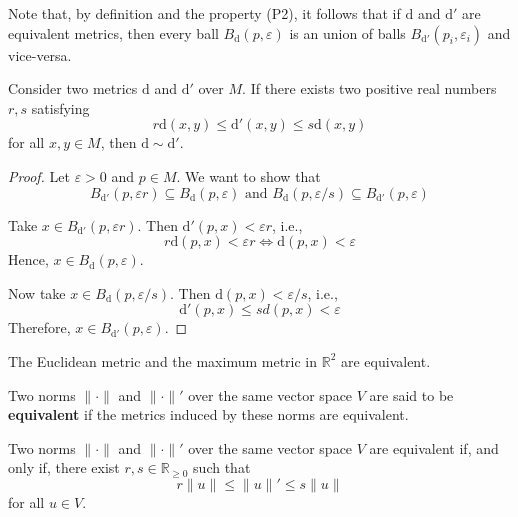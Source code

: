 Note that, by definition and the property (P2), it follows that if $\mathrm{d}$ and $\mathrm{d}'$ are equivalent metrics, then every ball $B_\mathrm{d}(p,\varepsilon)$ is an union of balls $B_{\mathrm{d}'}(p_i, \varepsilon_i)$ and vice-versa.

\begin{proposition}
	Consider two metrics $\mathrm{d}$ and $\mathrm{d}'$ over $M$. If there exists two positive real numbers $r, s$ satisfying
	\[
		r\mathrm{d}(x,y) \leq \mathrm{d}'(x,y) \leq s\mathrm{d}(x,y)
	\]
	for all $x,y \in M$, then $\mathrm{d} \sim \mathrm{d}'$.
\end{proposition}

\begin{proof}
	Let $\varepsilon > 0$ and $p \in M$. We want to show that 
	\[
		B_{\mathrm{d}'}(p, \varepsilon r) \subseteq B_\mathrm{d}(p, \varepsilon) \text{ and } B_\mathrm{d}(p, \varepsilon/s) \subseteq B_{\mathrm{d}'}(p,\varepsilon)
	\]

	Take $x \in B_{\mathrm{d}'}(p, \varepsilon r)$. Then $\mathrm{d}'(p, x) < \varepsilon r$, i.e.,
	\[
	    r\mathrm{d}(p,x) < \varepsilon r \iff \mathrm{d}(p,x) < \varepsilon
	\]
	Hence, $x \in B_\mathrm{d}(p, \varepsilon)$.

	Now take $x \in B_\mathrm{d}(p, \varepsilon / s)$. Then $\mathrm{d}(p,x) < \varepsilon/s$, i.e.,
	\[
		\mathrm{d}'(p,x) \leq sd(p,x) < \varepsilon
	\]
	Therefore, $x \in B_{\mathrm{d}'}(p, \varepsilon)$.
\end{proof}

\begin{example}
	The Euclidean metric and the maximum metric in $\mathbb{R}^2$ are equivalent.
\end{example}

\begin{definition}
	Two norms $\| \cdot \|$ and $\| \cdot \|'$ over the same vector space $V$ are said to be \textbf{equivalent} if the metrics induced by these norms are equivalent.
\end{definition}

\begin{proposition}
	Two norms $\| \cdot \|$ and $\| \cdot \|'$ over the same vector space $V$ are equivalent if, and only if, there exist $r, s \in \mathbb{R}_{\geq 0}$ such that 
	\[
		r \| u \| \leq \| u \|' \leq s \| u \|
	\]
	for all $u \in V$.
\end{proposition}

